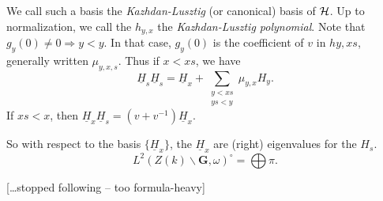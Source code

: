 \documentclass{article}
\begin{document}
We call such a basis the \emph{Kazhdan-Lusztig} (or canonical) basis of $\mathcal{H}$. Up 
to normalization, we call the $h_{y,x}$ the \emph{Kazhdan-Lusztig polynomial}. 
Note that $g_y(0)\ne 0\Rightarrow y < y$. In that case, $g_y(0)$ is the coefficient 
of $v$ in $h y, x s$, generally written $\mu_{y,x,s}$. Thus if $x<x s$, we have
\[
  \underline H_{ s} \underline H_s = \underline H_x + \sum_{\substack{y<x s \\ y s<y}} \mu_{y, x} H_y .
\]
If $x s<x$, then $\underline H_x \underline H_s = (v+v^{-1}) \underline H_x$. 

So with respect to the basis $\{\underline H_x\}$, the $\underline H_x$ are 
(right) eigenvalues for the $H_s$. 
\[
  L^2(Z(k)\backslash \mathbf G,\omega)^\circ = \bigoplus \pi .
\]

[\ldots stopped following -- too formula-heavy]
\end{document}
